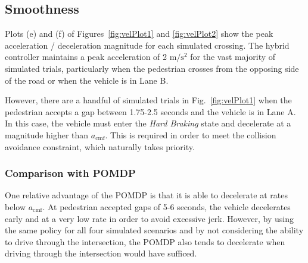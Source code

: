 \documentclass[letterpaper, 10 pt, conference]{ieeeconf} %
\begin{document}




\subsection{Smoothness}
Plots (e) and (f) of Figures~\ref{fig:velPlot1} and \ref{fig:velPlot2} show the peak acceleration / deceleration magnitude for each simulated crossing. The hybrid controller maintains a peak acceleration of 2 $\mathrm{m/s^2}$ for the vast majority of simulated trials, particularly when the pedestrian crosses from the opposing side of the road or when the vehicle is in Lane B.

However, there are a handful of simulated trials in Fig.~\ref{fig:velPlot1} when the pedestrian accepts a gap between 1.75-2.5 seconds and the vehicle is in Lane A. In this case, the vehicle must enter the \textit{Hard Braking} state and decelerate at a magnitude higher than $a_\mathrm{cmf}$. This is required in order to meet the collision avoidance constraint, which naturally takes priority.

\subsubsection{Comparison with POMDP}
 One relative advantage of the POMDP is that it is able to decelerate at rates below $a_\mathrm{cmf}$. At pedestrian accepted gaps of 5-6 seconds, the vehicle decelerates early and at a very low rate in order to avoid excessive jerk. However, by using the same policy for all four simulated scenarios and by not considering the ability to drive through the intersection, the POMDP also tends to decelerate when driving through the intersection would have sufficed. 
\end{document}
